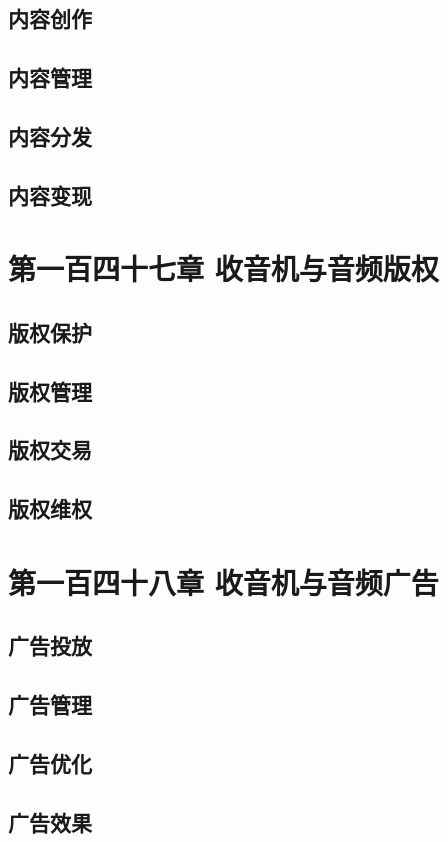 \documentclass[12pt,UTF8]{ctexbook}
\begin{document}
\section{内容创作}
\section{内容管理}
\section{内容分发}
\section{内容变现}

\chapter{第一百四十七章 收音机与音频版权}

\section{版权保护}
\section{版权管理}
\section{版权交易}
\section{版权维权}

\chapter{第一百四十八章 收音机与音频广告}

\section{广告投放}
\section{广告管理}
\section{广告优化}
\section{广告效果}
\end{document}
